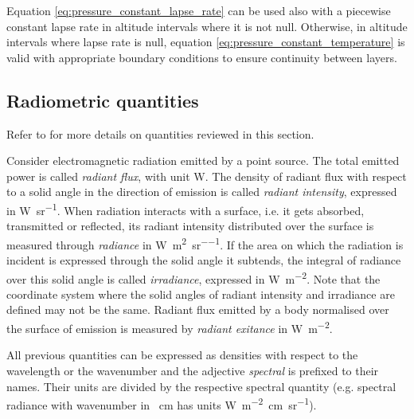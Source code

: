 \documentclass[a4paper,10pt,twocolumn,\classoptions]{article}
\begin{document}
Equation \eqref{eq:pressure_constant_lapse_rate} can be used also with a piecewise constant lapse rate in altitude intervals where it is not null. Otherwise, in altitude intervals where lapse rate is null, equation \eqref{eq:pressure_constant_temperature} is valid with appropriate boundary conditions to ensure continuity between layers.



\subsection{Radiometric quantities}
\label{sec:Radiometric quantities}
Refer to \cite{CIE} for more details on quantities reviewed in this section.

Consider electromagnetic radiation emitted by a point source. The total emitted power is called \emph{radiant flux}, with unit \unit{\watt}. The density of radiant flux with respect to a solid angle in the direction of emission is called \emph{radiant intensity}, expressed in \unit{\watt\per\steradian}. When radiation interacts with a surface, i.e. it gets absorbed, transmitted or reflected, its radiant intensity distributed over the surface is measured through \emph{radiance} in \unit{\watt\per\square\metre\per\steradian}. If the area on which the radiation is incident is expressed through the solid angle it subtends, the integral of radiance over this solid angle is called \emph{irradiance}, expressed in \unit{\watt\per\square\metre}. Note that the coordinate system where the solid angles of radiant intensity and irradiance are defined may not be the same. Radiant flux emitted by a body normalised over the surface of emission is measured by \emph{radiant exitance} in \unit{\watt\per\square\metre}.


All previous quantities can be expressed as densities with respect to the wavelength or the wavenumber and the adjective \emph{spectral} is prefixed to their names. Their units are divided by the respective spectral quantity (e.g. spectral radiance with wavenumber in \unit{\per\centi\metre} has units \unit{\watt\per\metre\squared\centi\metre\per\steradian}).
\end{document}

